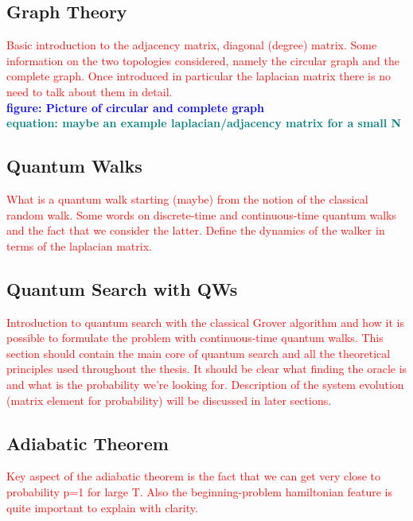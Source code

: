 \documentclass[aps,pra,reprint, onecolumn, showkeys]{revtex4-2}
\newcommand{\red}[1]{\textcolor{red}{#1}}
\newcommand{\blue}[1]{\textcolor{blue}{\textbf{figure: #1}}}
\newcommand{\teal}[1]{\textcolor{teal}{\textbf{equation: #1}}}
\begin{document}
\subsection{Graph Theory}
\red{Basic introduction to the adjacency matrix, diagonal (degree) matrix. Some information on the two topologies considered, namely the circular graph and the complete graph. Once introduced in particular the laplacian matrix there is no need to talk about them in detail.}\\
\blue{Picture of circular and complete graph}\\
\teal{maybe an example laplacian/adjacency matrix for a small N}


\subsection{Quantum Walks}
\red{What is a quantum walk starting (maybe) from the notion of the classical random walk. Some words on discrete-time and continuous-time quantum walks and the fact that we consider the latter. Define the dynamics of the walker in terms of the laplacian matrix.}


\subsection{Quantum Search with QWs}
\red{Introduction to quantum search with the classical Grover algorithm and how it is possible to formulate the problem with continuous-time quantum walks. This section should contain the main core of quantum search and all the theoretical principles used throughout the thesis. It should be clear what finding the oracle is and what is the probability we're looking for. Description of the system evolution (matrix element for probability) will be discussed in later sections.}


\subsection{Adiabatic Theorem}

\red{Key aspect of the adiabatic theorem is the fact that we can get very close to probability p=1 for large T. Also the beginning-problem hamiltonian feature is quite important to explain with clarity.}\\
\end{document}
